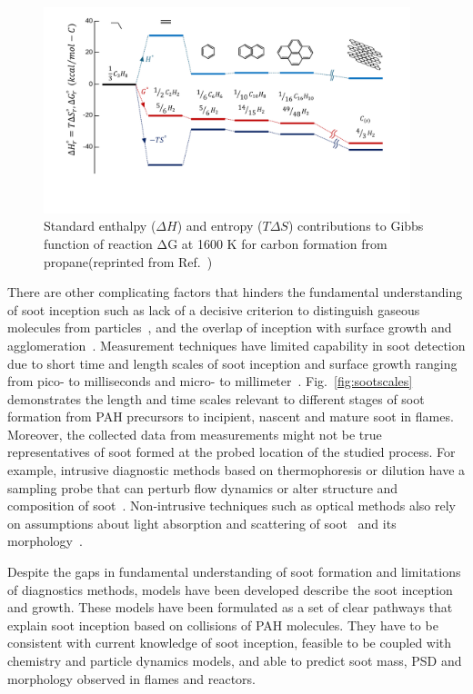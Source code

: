 \begin{figure}[!htbp]
	\centering
	\includegraphics[height=60mm, ]{Figures/Introduction/gibbs_propane.pdf}
	\caption{Standard enthalpy (${\Delta H}$) and entropy (${T\Delta S}$) contributions to Gibbs function of reaction $\mathrm{\Delta G}$ at 1600 K for carbon formation from propane(reprinted from Ref.~\citep{Wang2011})}
	\label{fig:gibbschange}
\end{figure} 

There are other complicating factors that hinders the fundamental understanding of soot inception such as lack of a decisive criterion to distinguish gaseous molecules from particles~\citep{d2009combustion}, and the overlap of inception with surface growth and agglomeration~\cite{martin2022soot}. Measurement techniques have limited capability in soot detection due to short time and length scales of soot inception and surface growth ranging from pico- to milliseconds and micro- to millimeter~\citep{violi2005relative}. Fig.~\ref{fig:sootscales} demonstrates the length and time scales relevant to different stages of soot formation from PAH precursors to incipient, nascent and mature soot in flames. Moreover, the collected data from measurements might not be true representatives of soot formed at the probed location of the studied process. For example, intrusive diagnostic methods based on thermophoresis or dilution have a sampling probe that can perturb flow dynamics or alter structure and composition of soot~\cite{kholghy2017comparison}. Non-intrusive techniques such as optical methods also rely on assumptions about light absorption and scattering of soot~\citep{shaddix1996laser} and its morphology~\citep{doner2017impact}.


Despite the gaps in fundamental understanding of soot formation and limitations of diagnostics methods, models have been developed describe the soot inception and growth. These models have been formulated as a set of clear pathways that explain soot inception based on collisions of PAH molecules. They have to be consistent with current knowledge of soot inception, feasible to be coupled with chemistry and particle dynamics models, and able to predict soot mass, PSD and morphology observed in flames and reactors.

